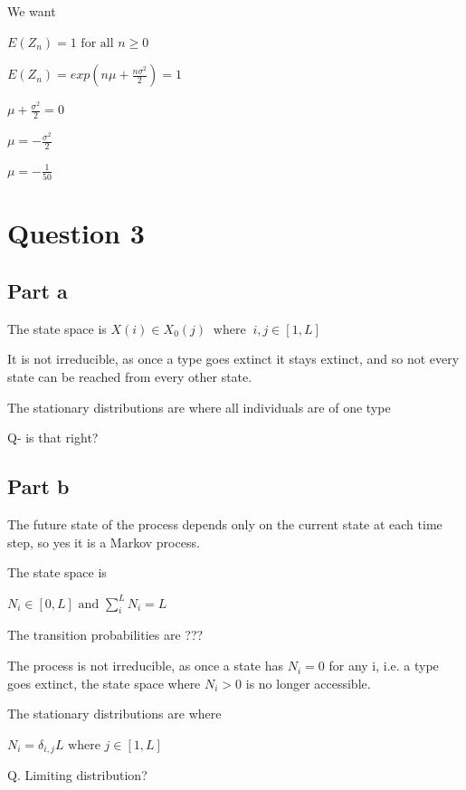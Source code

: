 \documentclass{article}
\begin{document}
We want 

$E(Z_n) = 1 \text{ for all } n\geq0$

$E(Z_n) = exp(n\mu + \frac{n\sigma^2}{2}) = 1$

$\mu + \frac{\sigma^2}{2} = 0$

$\mu = - \frac{\sigma^2}{2}$

$\mu = -\frac{1}{50}$


\section{Question 3}

\subsection{Part a}

The state space is $X(i) \in X_0(j) \ \text{ where } \ i,j \in [1,L]$ 

It is not irreducible, as once a type goes extinct it stays extinct, and so not every state can be reached from every other state.

The stationary distributions are where all individuals are of one type

Q- is that right?

\subsection{Part b}

The future state of the process depends only on the current state at each time step, so yes it is a Markov process. 

The state space is 

$N_i \in [0,L] \text{ and } \sum\limits_i^LN_i = L$ 

The transition probabilities are ???

The process is not irreducible, as once a state has $N_i = 0$ for any i, i.e. a type goes extinct, the state space where $N_i >0$ is no longer accessible.

The stationary distributions are where 

$N_i = \delta_{i,j}L \text{ where } j \in [1,L]$

Q. Limiting distribution?
\end{document}
